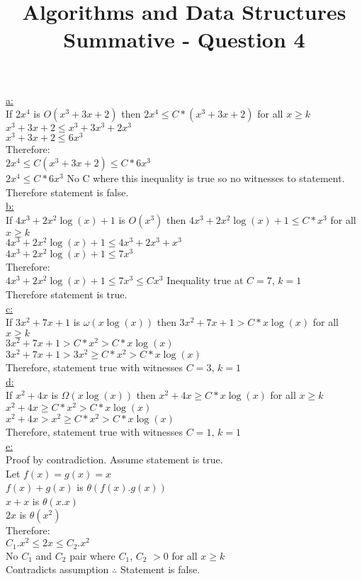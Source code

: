 \documentclass[10pt,a4paper]{article}
\title{Algorithms and Data Structures Summative - Question 4}
\begin{document}
	\underline{a:}\\ 	
	If $2x^4$ is $O(x^3 + 3x + 2)$ then $2x^4 \leq C*(x^3 + 3x + 2)$ for all $x \geq k$\\	
	$x^3 + 3x + 2 \leq x^3 + 3x^3 + 2x^3$\\	
	$x^3 + 3x + 2 \leq 6x^3$\\	
	Therefore:\\	
	$2x^4 \leq C(x^3 + 3x + 2) \leq C * 6x^3$\\
	$2x^4 \leq C *6x^3$ No C where this inequality is true so no witnesses to statement.\\ 	
	Therefore statement is false.\\
	
	\underline{b:} \\
	If $4x^3 + 2x^2\log(x) + 1$ is $O(x^3)$ then $4x^3 + 2x^2\log(x) + 1 \leq C*x^3$ for all $x \geq k$ \\
	$4x^3 + 2x^2\log(x) + 1 \leq 4x^3 + 2x^3 + x^3$\\
	$4x^3 + 2x^2\log(x) + 1 \leq 7x^3$\\
	Therefore:\\
	$4x^3 + 2x^2\log(x) + 1 \leq 7x^3 \leq Cx^3$ Inequality true at $C=7$, $k=1$\\
	Therefore statement is true.\\
	
	\underline{c:}\\
	If $3x^2 + 7x + 1$ is $\omega (x\log(x))$ then $3x^2 + 7x + 1 > C*x\log(x)$ for all $x \geq k$\\
	$3x^2 + 7x + 1 > C*x^2 > C*x\log(x)$\\
	$3x^2 + 7x + 1 > 3x^2 \geq C*x^2 > C*x\log(x)$\\
	Therefore, statement true with witnesses $C=3$, $k=1$\\
	
	\underline{d:}\\
	If $x^2 + 4x$ is $\Omega(x\log(x))$ then $x^2 + 4x \geq C*x\log(x)$ for all $x \geq k$ \\
	$x^2 + 4x \geq C*x^2 > C*x\log(x)$\\
	$x^2 + 4x > x^2 \geq C*x^2 > C*x\log(x)$\\
	Therefore, statement true with witnesses $C=1$, $k=1$\\
	
	\underline{e:}\\
	Proof by contradiction. Assume statement is true.\\
	Let $f(x) = g(x) = x$\\
	$f(x) + g(x)$ is $\theta(f(x).g(x))$\\
	$x + x$ is $\theta(x.x)$\\
	$2x$ is $\theta(x^2)$\\
	Therefore:\\
	$C_1.x^2 \leq 2x \leq C_2.x^2$\\
	No $C_1$ and $C_2$ pair where $C_1$, $C_2$ $>0$ for all $x \geq k$ \\
	Contradicts assumption $\therefore$ Statement is false.
	
\end{document}
